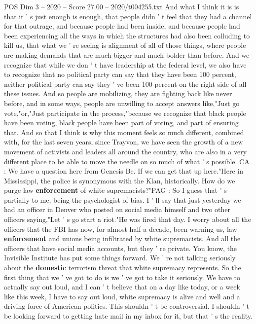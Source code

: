 \begin{textsample}{POS Dim 3 – 2020 – Score 27.00 – 2020/t004255.txt}
And what I think it is is that it ' s just enough is enough, that people didn ' t feel that they had a channel for that outrage, and because people had been inside, and because people had been experiencing all the ways in which the structures had also been colluding to kill us, that what we ' re seeing is alignment of all of those things, where people are making demands that are much bigger and much bolder than before.
And we recognize that while we don ' t have leadership at the federal level, we also have to recognize that no political party can say that they have been 100 percent, neither political party can say they ' ve been 100 percent on the right side of all these issues.
And so people are mobilizing, they are fighting back like never before, and in some ways, people are unwilling to accept answers like,"Just go vote,"or,"Just participate in the process,"because we recognize that black people have been voting, black people have been part of voting, and part of ensuring that.
And so that I think is why this moment feels so much different, combined with, for the last seven years, since Trayvon, we have seen the growth of a new movement of activists and leaders all around the country, who are also in a very different place to be able to move the needle on so much of what ' s possible.
CA : We have a question here from Genesis Be.
If we can get that up here."Here in Mississippi, the police is synonymous with the Klan, historically.
How do we purge law \textbf{enforcement} of white supremacists?"PAG : So I guess that ' s partially to me, being the psychologist of bias.
I ' ll say that just yesterday we had an officer in Denver who posted on social media himself and two other officers saying,"Let ' s go start a riot."He was fired that day.
I worry about all the officers that the FBI has now, for almost half a decade, been warning us, law \textbf{enforcement} and unions being infiltrated by white supremacists.
And all the officers that have social media accounts, but they ' re private.
You know, the Invisible Institute has put some things forward.
We ' re not talking seriously about the \textbf{domestic} terrorism threat that white supremacy represents.
So the first thing that we ' ve got to do is we ' ve got to take it seriously.
We have to actually say out loud, and I can ' t believe that on a day like today, or a week like this week, I have to say out loud, white supremacy is alive and well and a driving force of American politics.
This shouldn ' t be controversial.
I shouldn ' t be looking forward to getting hate mail in my inbox for it, but that ' s the reality.

\end{textsample}
